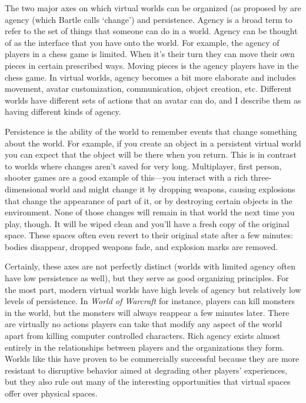 The two major axes on which virtual worlds can be organized (as proposed by \citet{Bartle:2003up} are agency (which Bartle calls `change') and persistence. Agency is a broad term to refer to the set of things that someone can do in a world. Agency can be thought of as the interface that you have onto the world. For example, the agency of players in a chess game is limited. When it's their turn they can move their own pieces in certain prescribed ways. Moving pieces is the agency players have in the chess game. In virtual worlds, agency becomes a bit more elaborate and includes movement, avatar customization, communication, object creation, etc. Different worlds have different sets of actions that an avatar can do, and I describe them as having different kinds of agency.

Persistence is the ability of the world to remember events that change something about the world. For example, if you create an object in a persistent virtual world you can expect that the object will be there when you return. This is in contrast to worlds where changes aren't saved for very long. Multiplayer, first person, shooter games are a good example of this---you interact with a rich three-dimensional world and might change it by dropping weapons, causing explosions that change the appearance of part of it, or by destroying certain objects in the environment. None of those changes will remain in that world the next time you play, though. It will be wiped clean and you'll have a fresh copy of the original space. These spaces often even revert to their original state after a few minutes: bodies disappear, dropped weapons fade, and explosion marks are removed. 

Certainly, these axes are not perfectly distinct (worlds with limited agency often have low persistence as well), but they serve as good organizing principles. For the most part, modern virtual worlds have high levels of agency but relatively low levels of persistence. In \emph{World of Warcraft} for instance, players can kill monsters in the world, but the monsters will always reappear a few minutes later. There are virtually no actions players can take that modify any aspect of the world apart from killing computer controlled characters. Rich agency exists almost entirely in the relationships between players and the organizations they form. Worlds like this have proven to be commercially successful because they are more resistant to disruptive behavior aimed at degrading other players' experiences, but they also rule out many of the interesting opportunities that virtual spaces offer over physical spaces.

